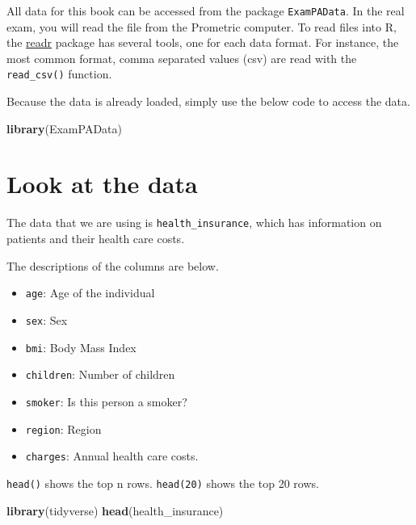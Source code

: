 \documentclass[
  openany]{book}
\newenvironment{Shaded}{\begin{snugshade}}{\end{snugshade}}
\newcommand{\KeywordTok}[1]{\textcolor[rgb]{0.13,0.29,0.53}{\textbf{#1}}}
\newcommand{\NormalTok}[1]{#1}
\providecommand{\tightlist}{%
  \setlength{\itemsep}{0pt}\setlength{\parskip}{0pt}}
\begin{document}
All data for this book can be accessed from the package \texttt{ExamPAData}. In the real exam, you will read the file from the Prometric computer. To read files into R, the \href{https://readr.tidyverse.org/articles/readr.html}{readr} package has several tools, one for each data format. For instance, the most common format, comma separated values (csv) are read with the \texttt{read\_csv()} function.

Because the data is already loaded, simply use the below code to access the data.

\begin{Shaded}
\begin{Highlighting}[]
\KeywordTok{library}\NormalTok{(ExamPAData)}
\end{Highlighting}
\end{Shaded}

\hypertarget{look-at-the-data}{%
\section{Look at the data}\label{look-at-the-data}}

The data that we are using is \texttt{health\_insurance}, which has information on patients and their health care costs.

The descriptions of the columns are below.

\begin{itemize}
\tightlist
\item
  \texttt{age}: Age of the individual
\item
  \texttt{sex}: Sex
\item
  \texttt{bmi}: Body Mass Index
\item
  \texttt{children}: Number of children
\item
  \texttt{smoker}: Is this person a smoker?
\item
  \texttt{region}: Region
\item
  \texttt{charges}: Annual health care costs.
\end{itemize}

\texttt{head()} shows the top n rows. \texttt{head(20)} shows the top 20 rows.

\begin{Shaded}
\begin{Highlighting}[]
\KeywordTok{library}\NormalTok{(tidyverse)}
\KeywordTok{head}\NormalTok{(health_insurance)}
\end{Highlighting}
\end{Shaded}
\end{document}
